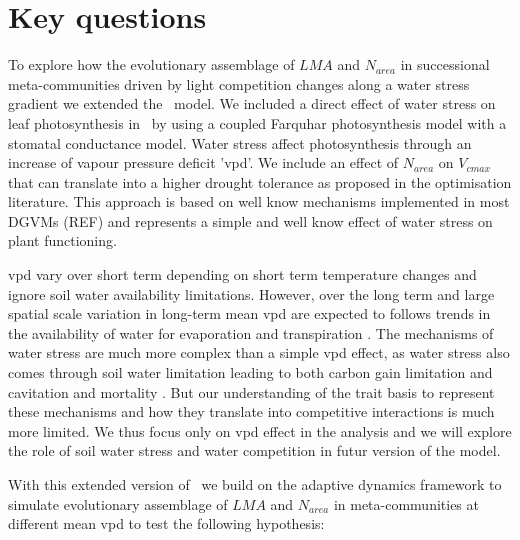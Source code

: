 \documentclass[a4paper,11pt]{article}
\begin{document}
\section{Key questions}

To explore how the evolutionary
assemblage of $LMA$ and $N_{area}$ in successional meta-communities
driven by light competition changes along a water stress gradient we
extended the \plant\ model. We included a direct effect of water
stress on leaf photosynthesis in \plant\ by using a coupled Farquhar
photosynthesis model with a stomatal conductance model. Water stress
affect photosynthesis through an increase of vapour pressure deficit
'vpd'. We include an effect of $N_{area}$ on $V_{cmax}$ that can
translate into a higher drought tolerance as proposed in the
optimisation literature. This approach
is based on well know mechanisms implemented in most DGVMs (REF)
and represents a simple and well know effect of water stress on plant
functioning.

vpd vary over short term depending on short term
temperature changes and ignore soil water availability
limitations. However, over the long term and large spatial scale
variation in long-term mean vpd are expected to follows trends in the
availability of water for evaporation and transpiration
\citep{Prentice-2014}. The mechanisms of water stress are much more complex than a simple vpd
effect, as water stress also comes through soil water limitation leading to
both carbon gain limitation and cavitation and mortality
\citep{Sperry-2016,Wolf-2016,Sperry-2017}. But our understanding of
the trait basis to represent these mechanisms and how they translate
into competitive interactions is much more limited. We thus focus only
on vpd effect in the analysis and we will explore the role of soil water stress and water competition in futur version of the model.

With this extended version of \plant\ we build on the adaptive dynamics framework to simulate evolutionary assemblage of $LMA$ and $N_{area}$ in meta-communities at different mean vpd to test the following hypothesis:  
 
\end{document}
